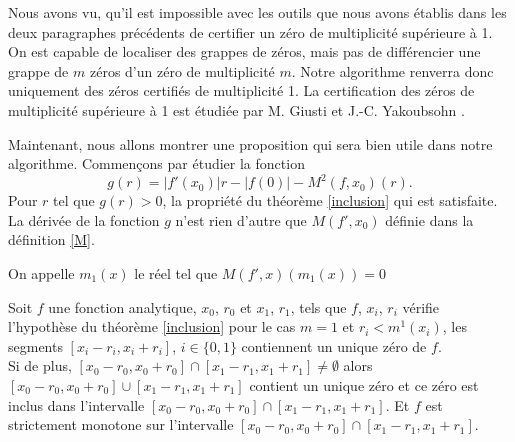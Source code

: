 \documentclass[a4paper,10pt]{article}
\begin{document}
	Nous avons vu, qu'il est impossible avec les outils que nous avons établis dans les deux paragraphes précédents de certifier un zéro de multiplicité supérieure à 1. On est capable de localiser des grappes de zéros, mais pas de différencier une grappe de $m$ zéros d'un zéro de multiplicité $m$. Notre algorithme renverra donc uniquement des zéros certifiés de multiplicité 1. La certification des zéros de multiplicité supérieure à 1 est étudiée par M. Giusti et J.-C. Yakoubsohn \cite{giusti2019approximation}. 
	
	\vspace{4mm}
	
	Maintenant, nous allons montrer une proposition qui sera bien utile dans notre algorithme.
	Commençons par étudier la fonction 
	\[g(r)=|f'(x_0)|r-|f(0)|-M^{2}(f,x_0)(r).\]
	Pour $r$ tel que $g(r)>0$, la propriété du théorème \ref{inclusion} qui est satisfaite. La dérivée de la fonction $g$ n'est rien d'autre que 
	$M(f',x_0)$ définie dans la définition \ref{M}.
	
	\begin{definition}
		On appelle $m_1(x)$ le réel tel que $M(f',x)(m_1(x))=0$ 
		\label{m_1}
	\end{definition}
	
	\begin{proposition}
		Soit $f$ une fonction analytique, $x_0$, $r_0$ et  $x_1$, $r_1$, tels que $f$, $x_i$, $r_i$ vérifie l'hypothèse du théorème \ref{inclusion} pour le cas $m=1$ et $r_i<m^1(x_i)$, les segments $[x_i-r_i,x_i+r_i]$, $i \in \{0,1\}$ contiennent un unique zéro de $f$.\\
		Si de plus, $[x_0-r_0,x_0+r_0] \cap [x_1-r_1,x_1+r_1] \neq \emptyset$ alors $[x_0-r_0,x_0+r_0] \cup [x_1-r_1,x_1+r_1]$ contient un unique zéro et ce zéro est inclus dans l'intervalle $[x_0-r_0,x_0+r_0] \cap [x_1-r_1,x_1+r_1]$. Et $f$ est strictement monotone sur l'intervalle $[x_0-r_0,x_0+r_0] \cap [x_1-r_1,x_1+r_1]$.
		\label{intersect}
	\end{proposition}
\end{document}
